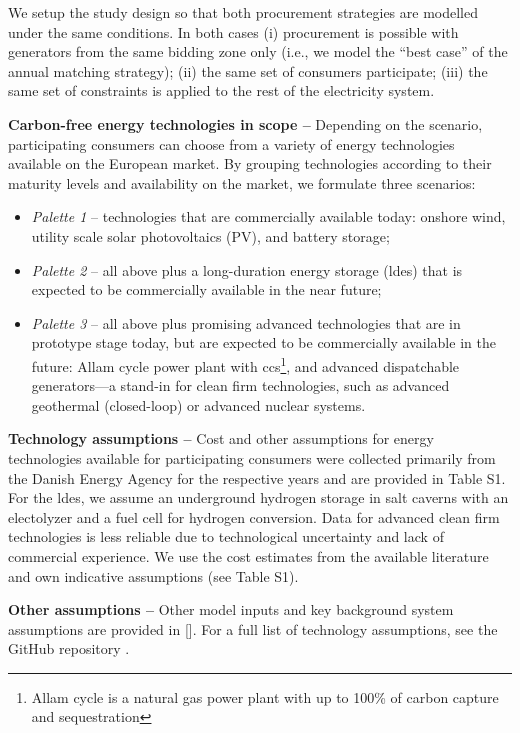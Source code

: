 We setup the study design so that both procurement strategies are modelled under the same conditions.
In both cases (i) procurement is possible with generators from the same bidding zone only (i.e., we model the \enquote{best case} of the annual matching strategy); (ii) the same set of consumers participate; (iii) the same set of constraints is applied to the rest of the electricity system.

\textbf{Carbon-free energy technologies in scope --} Depending on the scenario, participating consumers can choose from a variety of energy technologies available on the European market. By grouping technologies according to their maturity levels and availability on the market, we formulate three scenarios:

\begin{itemize}[-]
    \item \textit{Palette 1} -- technologies that are commercially available today: onshore wind, utility scale solar photovoltaics (\gls{PV}), and battery storage;
    \item \textit{Palette 2} -- all above plus a long-duration energy storage (\gls{ldes}) that is expected to be commercially available in the near future; 
    \item \textit{Palette 3} -- all above plus promising advanced technologies that are in prototype stage today, but are expected to be commercially available in the future: Allam cycle power plant with \gls{ccs}\footnote{Allam cycle is a natural gas power plant with up to 100\% of carbon capture and sequestration}, and advanced dispatchable generators---a stand-in for clean firm technologies, such as advanced geothermal (closed-loop) or advanced nuclear systems.
\end{itemize}

\textbf{Technology assumptions --} Cost and other assumptions for energy technologies available for participating consumers were collected primarily from the Danish Energy Agency \cite{DEA-technologydata} for the respective years and are provided in Table S1. 
For the \gls{ldes}, we assume an underground hydrogen storage in salt caverns with an electolyzer and a fuel cell for hydrogen conversion. 
Data for advanced clean firm technologies is less reliable due to technological uncertainty and lack of commercial experience. 
We use the cost estimates from the available literature and own indicative assumptions (see Table S1).

\textbf{Other assumptions --} Other model inputs and key background system assumptions are provided in []. For a full list of technology assumptions, see the GitHub repository \cite{github-247CFEpaper}.